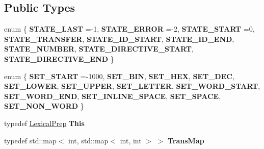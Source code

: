 \subsection*{Public Types}
\begin{DoxyCompactItemize}
\item 
\mbox{\label{class_lexical_prep_a60c1c35463f407a559cc3412f822a4b7}} 
enum \{ \newline
{\bfseries S\+T\+A\+T\+E\+\_\+\+L\+A\+ST} =-\/1, 
{\bfseries S\+T\+A\+T\+E\+\_\+\+E\+R\+R\+OR} =-\/2, 
{\bfseries S\+T\+A\+T\+E\+\_\+\+S\+T\+A\+RT} =0, 
{\bfseries S\+T\+A\+T\+E\+\_\+\+T\+R\+A\+N\+S\+F\+ER}, 
\newline
{\bfseries S\+T\+A\+T\+E\+\_\+\+I\+D\+\_\+\+S\+T\+A\+RT}, 
{\bfseries S\+T\+A\+T\+E\+\_\+\+I\+D\+\_\+\+E\+ND}, 
{\bfseries S\+T\+A\+T\+E\+\_\+\+N\+U\+M\+B\+ER}, 
{\bfseries S\+T\+A\+T\+E\+\_\+\+D\+I\+R\+E\+C\+T\+I\+V\+E\+\_\+\+S\+T\+A\+RT}, 
\newline
{\bfseries S\+T\+A\+T\+E\+\_\+\+D\+I\+R\+E\+C\+T\+I\+V\+E\+\_\+\+E\+ND}
 \}
\item 
\mbox{\label{class_lexical_prep_a405f073320a7d149537acbdb50c01d2d}} 
enum \{ \newline
{\bfseries S\+E\+T\+\_\+\+S\+T\+A\+RT} =-\/1000, 
{\bfseries S\+E\+T\+\_\+\+B\+IN}, 
{\bfseries S\+E\+T\+\_\+\+H\+EX}, 
{\bfseries S\+E\+T\+\_\+\+D\+EC}, 
\newline
{\bfseries S\+E\+T\+\_\+\+L\+O\+W\+ER}, 
{\bfseries S\+E\+T\+\_\+\+U\+P\+P\+ER}, 
{\bfseries S\+E\+T\+\_\+\+L\+E\+T\+T\+ER}, 
{\bfseries S\+E\+T\+\_\+\+W\+O\+R\+D\+\_\+\+S\+T\+A\+RT}, 
\newline
{\bfseries S\+E\+T\+\_\+\+W\+O\+R\+D\+\_\+\+E\+ND}, 
{\bfseries S\+E\+T\+\_\+\+I\+N\+L\+I\+N\+E\+\_\+\+S\+P\+A\+CE}, 
{\bfseries S\+E\+T\+\_\+\+S\+P\+A\+CE}, 
{\bfseries S\+E\+T\+\_\+\+N\+O\+N\+\_\+\+W\+O\+RD}
 \}
\item 
\mbox{\label{class_lexical_prep_ab89a0700201b17dd52ee42dbb57091e1}} 
typedef \hyperlink{class_lexical_prep}{Lexical\+Prep} {\bfseries This}
\item 
\mbox{\label{class_lexical_prep_a4172b70edddc5cd9dbaa67a432ad3141}} 
typedef std\+::map$<$ int, std\+::map$<$ int, int $>$ $>$ {\bfseries Trans\+Map}
\end{DoxyCompactItemize}
